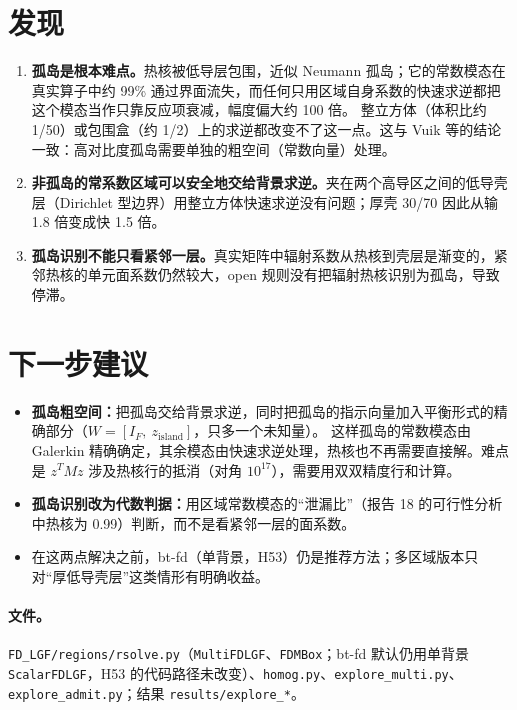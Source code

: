 \documentclass[11pt,a4paper]{ctexart}
\begin{document}
\section{发现}
\begin{enumerate}
\item \textbf{孤岛是根本难点。}热核被低导层包围，近似 Neumann 孤岛；它的常数模态在真实算子中约 99\% 通过界面流失，而任何只用区域自身系数的快速求逆都把这个模态当作只靠反应项衰减，幅度偏大约 100 倍。
整立方体（体积比约 1/50）或包围盒（约 1/2）上的求逆都改变不了这一点。这与 Vuik 等的结论一致：高对比度孤岛需要单独的粗空间（常数向量）处理。
\item \textbf{非孤岛的常系数区域可以安全地交给背景求逆。}夹在两个高导区之间的低导壳层（Dirichlet 型边界）用整立方体快速求逆没有问题；厚壳 30/70 因此从输 1.8 倍变成快 1.5 倍。
\item \textbf{孤岛识别不能只看紧邻一层。}真实矩阵中辐射系数从热核到壳层是渐变的，紧邻热核的单元面系数仍然较大，open 规则没有把辐射热核识别为孤岛，导致停滞。
\end{enumerate}

\section{下一步建议}
\begin{itemize}
\item \textbf{孤岛粗空间：}把孤岛交给背景求逆，同时把孤岛的指示向量加入平衡形式的精确部分（$W=[I_F,\ z_{\text{island}}]$，只多一个未知量）。
这样孤岛的常数模态由 Galerkin 精确确定，其余模态由快速求逆处理，热核也不再需要直接解。难点是 $z^TMz$ 涉及热核行的抵消（对角 $10^{17}$），需要用双双精度行和计算。
\item \textbf{孤岛识别改为代数判据：}用区域常数模态的“泄漏比”（报告 18 的可行性分析中热核为 0.99）判断，而不是看紧邻一层的面系数。
\item 在这两点解决之前，bt-fd（单背景，H53）仍是推荐方法；多区域版本只对“厚低导壳层”这类情形有明确收益。
\end{itemize}

\paragraph{文件。}\sloppy \texttt{FD\_LGF/regions/rsolve.py}（\texttt{MultiFDLGF}、\texttt{FDMBox}；bt-fd 默认仍用单背景 \texttt{ScalarFDLGF}，H53 的代码路径未改变）、\texttt{homog.py}、\texttt{explore\_multi.py}、\texttt{explore\_admit.py}；结果 \texttt{results/explore\_*}。
\end{document}
